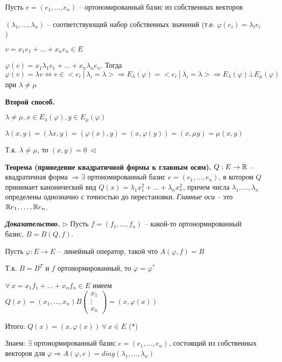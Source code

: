 Пусть $e = (e_1, \dots, e_n)$ -- ортономированный базис из собственных векторов

$(\lambda_1, \dots, \lambda_n)$ -- соответствующий набор собственных значений (т.е. $\varphi (e_i) = \lambda_i e_i$)

$v = x_1 e_1 + \dots + x_n e_n \in E$

$\varphi(v) = x_1 \lambda_1 e_1 + \dots + x_n \lambda_n e_n$. Тогда $\varphi (v) = \lambda v \Leftrightarrow v \in <e_i \ | \ \lambda_i = \lambda> \Rightarrow E_{\lambda} (\varphi) = <e_i \ | \ \lambda_i = \lambda > \Rightarrow E_{\lambda} (\varphi) \bot E_{\mu} (\varphi)$ при $\lambda \neq \mu$

\vspace{\baselineskip}
\textbf{Второй способ.}

$\lambda \neq \mu, x \in E_{\lambda} (\varphi), y \in E_{\mu} (\varphi)$

$\lambda(x, y) = (\lambda x, y) = (\varphi(x), y) = (x, \varphi(y)) = (x, \mu y) = \mu (x, y)$

Т.к. $\lambda \neq \mu$, то $(x, y) = 0 \ \lhd$

\vspace{\baselineskip}
\textbf{Теорема (приведение квадратичной формы к главным осям).} $Q: E \rightarrow \mathbb{R}$ -- квадратичная форма $\Rightarrow \exists$ ортономированный базис $e = (e_1, \dots, e_n)$, в котором $Q$ принимает канонический вид $Q(x) = \lambda_1 x_1^2 + \dots + \lambda_n x_n^2$, причем числа $\lambda_1, \dots, \lambda_n$ определены однозначно с точностью до перестановки. \textit{Главные оси} -- это $\mathbb{R} e_1, \dots, \mathbb{R} e_n$.

\vspace{\baselineskip}
\textbf{\textit{Доказательство.}} $\rhd$ Пусть $f = (f_1, \dots, f_n)$ -- какой-то ортонормированный базис, $B = B(Q, f)$.

Пусть $\varphi: E \rightarrow E$ -- линейный оператор, такой что $A(\varphi, f) = B$

Т.к. $B = B^T$ и $f$ ортонормированный, то $\varphi = \varphi^*$

$\forall \ x = x_1 f_1 + \dots + x_n f_n \in E$ имеем $Q(x) = (x_1, \dots, x_n) B \begin{pmatrix} x_1 \\ \vdots \\ x_n \end{pmatrix} = (x, \varphi(x))$

Итого: $Q(x) = (x, \varphi(x)) \ \forall \ x \in E$ (*)

\vspace{\baselineskip}
Знаем: $\exists$ ортонормированный базис $e= (e_1, \dots, e_n)$, состоящий из собственных векторов для $\varphi \Rightarrow A(\varphi, e) = diag (\lambda_1, \dots, \lambda_n)$

